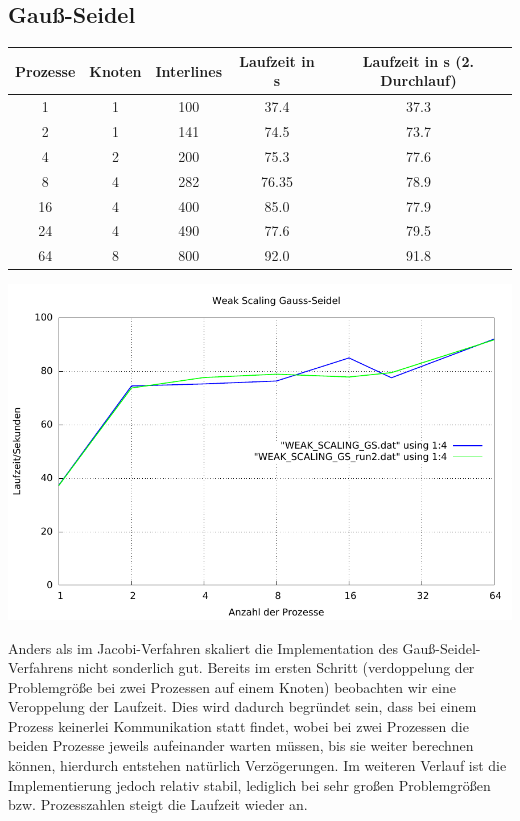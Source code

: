 \documentclass[a4paper]{article}
\begin{document}
\subsection{Gauß-Seidel}
\begin{tabular}{|c|c|c|c|c|}
\hline 
Prozesse & Knoten & Interlines & Laufzeit in s & Laufzeit in s (2. Durchlauf) \\ 
\hline 
1 & 1 & 100 & 37.4 & 37.3 \\ 
\hline 
2 & 1 & 141 & 74.5 & 73.7 \\ 
\hline 
4 & 2 & 200 & 75.3 & 77.6 \\ 
\hline 
8 & 4 & 282 & 76.35 & 78.9 \\ 
\hline 
16 & 4 & 400 & 85.0 & 77.9 \\ 
\hline 
24 & 4 & 490 & 77.6 & 79.5 \\ 
\hline 
64 & 8 & 800 & 92.0 & 91.8 \\ 
\hline 
\end{tabular} 

\includegraphics[scale=0.8]{img/WEAK_SCALING_GS_laufzeit.pdf}

Anders als im Jacobi-Verfahren skaliert die Implementation des Gauß-Seidel-Verfahrens nicht sonderlich gut. Bereits im ersten Schritt (verdoppelung der Problemgröße bei zwei Prozessen auf einem Knoten) beobachten wir eine Veroppelung der Laufzeit. Dies wird dadurch begründet sein, dass bei einem Prozess keinerlei Kommunikation statt findet, wobei bei zwei Prozessen die beiden Prozesse jeweils aufeinander warten müssen, bis sie weiter berechnen können, hierdurch entstehen natürlich Verzögerungen. Im weiteren Verlauf ist die Implementierung jedoch relativ stabil, lediglich bei sehr großen Problemgrößen bzw. Prozesszahlen steigt die Laufzeit wieder an.
\end{document}
